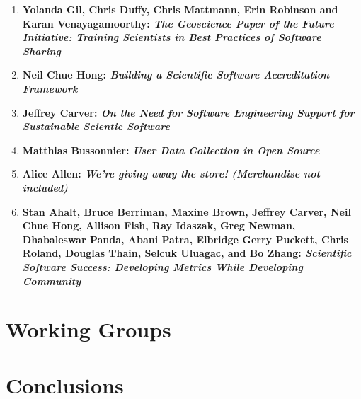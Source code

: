 \documentclass[11pt, oneside]{amsart}
\begin{document}
\begin{enumerate}
\item \textbf{Yolanda Gil, Chris Duffy, Chris Mattmann, Erin Robinson and Karan
Venayagamoorthy: \textit{The Geoscience Paper of the Future Initiative: Training
Scientists in Best Practices of Software Sharing}}

\item \textbf{Neil Chue Hong: \textit{Building a Scientific Software Accreditation
Framework}}

\item \textbf{Jeffrey Carver: \textit{On the Need for Software Engineering Support for
Sustainable Scientic Software}}

\item \textbf{Matthias Bussonnier: \textit{User Data Collection in Open Source}}

\item \textbf{Alice Allen: \textit{We’re giving away the store! (Merchandise not
included)}}

\item \textbf{Stan Ahalt, Bruce Berriman, Maxine Brown, Jeffrey Carver, Neil
Chue Hong, Allison Fish, Ray Idaszak, Greg Newman, Dhabaleswar Panda, Abani
Patra, Elbridge Gerry Puckett, Chris Roland, Douglas Thain, Selcuk Uluagac, and
Bo Zhang: \textit{Scientific Software Success: Developing Metrics While Developing
Community}}

\end{enumerate}

\section{Working Groups} \label{sec:WGs}



%









\section{Conclusions} \label{sec:conclusions}
\end{document}
